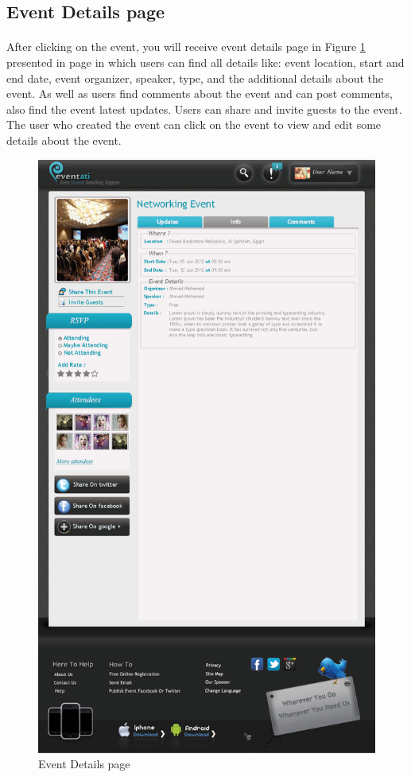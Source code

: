 \documentclass[12pt,a4paper,class,twoside,openany]{report}
\begin{document}
{\subsection{Event Details page}
 \paragraph*{\hspace{.9 cm} } After clicking on the event, you will receive event details page in Figure \ref{fg:6-12} presented in page \pageref{fg:6-12} in which users can find all details like: event location, start and end date, event organizer, speaker, type, and the additional details about the event. As well as users find comments about the event and can post comments, also find the event latest updates. Users can share and invite guests to the event. The user who created the event can click on the event to view and edit some details about the event.
 
\begin{figure}
\begin{center}
\includegraphics[height=8.10 in]{6-12}
\caption{Event Details page}
\label{fg:6-12}
\end{center}
\end{figure}

}
\end{document}
